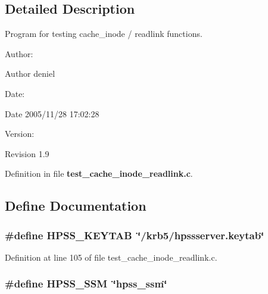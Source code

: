 \subsection{Detailed Description}
Program for testing cache\_\-inode / readlink functions. 

\begin{Desc}
\item[Author:]\begin{Desc}
\item[Author]deniel \end{Desc}
\end{Desc}
\begin{Desc}
\item[Date:]\begin{Desc}
\item[Date]2005/11/28 17:02:28 \end{Desc}
\end{Desc}
\begin{Desc}
\item[Version:]\begin{Desc}
\item[Revision]1.9 \end{Desc}
\end{Desc}


Definition in file {\bf test\_\-cache\_\-inode\_\-readlink.c}.

\subsection{Define Documentation}
\subsubsection{\setlength{\rightskip}{0pt plus 5cm}\#define HPSS\_\-KEYTAB\ \char`\"{}/krb5/hpssserver.keytab\char`\"{}}\label{test__cache__inode__readlink_8c_a1}




Definition at line 105 of file test\_\-cache\_\-inode\_\-readlink.c.
\subsubsection{\setlength{\rightskip}{0pt plus 5cm}\#define HPSS\_\-SSM\ \char`\"{}hpss\_\-ssm\char`\"{}}\label{test__cache__inode__readlink_8c_a0}




